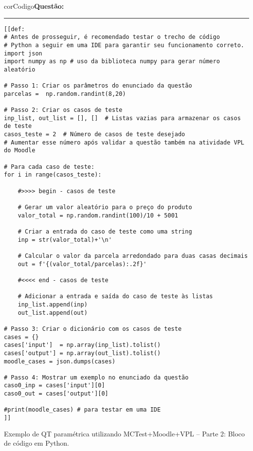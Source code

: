 

\begin{listing}[!ht]
\begin{myboxCode}{corCodigo}{\textbf{Questão: } }\vspace{3mm}
\hrule
\begin{verbatim}
[[def: 
# Antes de prosseguir, é recomendado testar o trecho de código  
# Python a seguir em uma IDE para garantir seu funcionamento correto.
import json
import numpy as np # uso da biblioteca numpy para gerar número aleatório 

# Passo 1: Criar os parâmetros do enunciado da questão
parcelas =  np.random.randint(8,20)

# Passo 2: Criar os casos de teste
inp_list, out_list = [], []  # Listas vazias para armazenar os casos de teste
casos_teste = 2  # Número de casos de teste desejado
# Aumentar esse número após validar a questão também na atividade VPL do Moodle

# Para cada caso de teste:
for i in range(casos_teste):    

    #>>>> begin - casos de teste

    # Gerar um valor aleatório para o preço do produto
    valor_total = np.random.randint(100)/10 + 5001 

    # Criar a entrada do caso de teste como uma string
    inp = str(valor_total)+'\n'

    # Calcular o valor da parcela arredondado para duas casas decimais
    out = f'{(valor_total/parcelas):.2f}'

    #<<<< end - casos de teste

    # Adicionar a entrada e saída do caso de teste às listas
    inp_list.append(inp)
    out_list.append(out)

# Passo 3: Criar o dicionário com os casos de teste
cases = {}
cases['input']  = np.array(inp_list).tolist()
cases['output'] = np.array(out_list).tolist()
moodle_cases = json.dumps(cases)

# Passo 4: Mostrar um exemplo no enunciado da questão
caso0_inp = cases['input'][0]
caso0_out = cases['output'][0]

#print(moodle_cases) # para testar em uma IDE
]]
\end{verbatim}
\end{myboxCode}
\caption{Exemplo de QT paramétrica utilizando MCTest+Moodle+VPL -- Parte 2: Bloco de código em Python.}
\label{lst:questaoQT_EP_1_parte2}
\end{listing}

